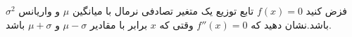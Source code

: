 
فزض کنید $f(x) = 0$ تابع توزیع یک متغیر تصادفی نرمال با میانگین $\mu$ و واریانس $\sigma ^ 2$ باشد.نشان دهید که $f''(x) = 0$ وقتی که $x$ برابر با مقادیر $\mu - \sigma$ و $\mu + \sigma$ باشد.